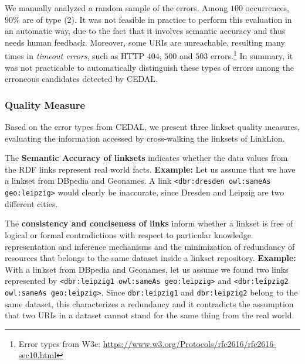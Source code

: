 We manually analyzed a random sample of the errors. Among $100$ occurrences, $90\%$ are of type (2). It was not feasible in practice to perform this evaluation in an automatic way, due to the fact that it involves semantic accuracy and thus needs human feedback. Moreover, some URIs are unreachable, resulting many times in \textit{timeout errors}, such as HTTP $404$, $500$ and $503$ errors.\footnote{Error types from W3c: \url{https://www.w3.org/Protocols/rfc2616/rfc2616-sec10.html}} In summary, it was not practicable to automatically distinguish these types of errors among the erroneous candidates detected by CEDAL. %

\subsubsection{Quality Measure}

Based on the error types from CEDAL, we present three linkset quality measures, evaluating the information accessed by cross-walking the linksets of LinkLion.

The \textbf{Semantic Accuracy of linksets} indicates whether the data values from the RDF links represent real world facts.
\textbf{Example:} Let us assume that we have a linkset from DBpedia and Geonames. A link \texttt{<dbr:dresden owl:sameAs geo:leipzig>} would clearly be inaccurate, since Dresden and Leipzig are two different cities.

The \textbf{consistency and conciseness of links} inform whether a linkset is free of logical or formal contradictions with respect to particular knowledge representation and inference mechanisms and the minimization of redundancy of resources that belongs to the same dataset inside a linkset repository.
\textbf{Example:} With a linkset from DBpedia and Geonames, let us assume we found two links represented by \texttt{<dbr:leipzig1 owl:sameAs geo:leipzig>} and \texttt{<dbr:leipzig2 owl:sameAs geo:leipzig>}. Since \texttt{dbr:leipzig1} and \texttt{dbr:leipzig2} belong to the same dataset, this characterizes a redundancy and it contradicts the assumption that two URIs in a dataset cannot stand for the same thing from the real world.

